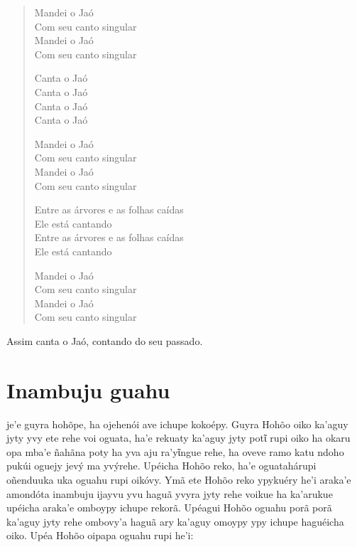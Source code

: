 \begin{verse}
Mandei o Jaó\\
Com seu canto singular\footnotemark{}\\
Mandei o Jaó\\
Com seu canto singular

Canta o Jaó\footnotemark{}\\
Canta o Jaó\\
Canta o Jaó\\
Canta o Jaó

Mandei o Jaó\\
Com seu canto singular\\
Mandei o Jaó\\
Com seu canto singular

Entre as árvores e as folhas caídas\\
Ele está cantando\\
Entre as árvores e as folhas caídas\\
Ele está cantando

Mandei o Jaó\\
Com seu canto singular\\
Mandei o Jaó\\
Com seu canto singular
\end{verse}

Assim canta o Jaó, contando do seu passado.



\chapter{Inambuju guahu}

 je'e guyra hohõpe, ha ojehenói ave ichupe kokoépy. Guyra Hohõo
oiko ka'aguy jyty yvy ete rehe voi oguata, ha'e rekuaty ka'aguy jyty
potῖ rupi oiko ha okaru opa mba'e ñahãna poty ha yva aju ra'yῖngue rehe,
ha oveve ramo katu ndoho pukúi oguejy jevý ma yvýrehe. Upéicha Hohõo
reko, ha'e oguatahárupi oñenduuka uka oguahu rupi oikóvy. Ymã ete Hohõo
reko ypykuéry he'i araka'e amondóta inambuju ijayvu yvu haguã yvyra jyty
rehe voikue ha ka'arukue upéicha araka'e omboypy ichupe rekorã. Upéagui
Hohõo oguahu porã porã ka'aguy jyty rehe ombovy'a haguã ary ka'aguy
omoypy ypy ichupe haguéicha oiko. Upéa Hohõo oipapa oguahu rupi he'i:

